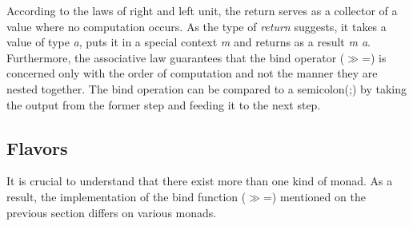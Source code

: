 \documentclass[a4paper, onecolumn]{article}
\begin{document}
According to the laws of right and left unit, the return serves as a collector of a value where no computation occurs. As the type of \textit{return} suggests, it takes a value of type \textit{a}, puts it in a special context \textit{m} and returns as a result \textit{m a}. Furthermore, the associative law guarantees that the bind operator ($\gg$=) is concerned only with the order of computation and not the manner they are nested together. The bind operation can be compared to a semicolon(;) by taking the output from the former step and feeding it to the next step.
\subsection{Flavors}

It is crucial to understand that there exist more than one kind of monad. As a result, the implementation of the bind function ($\gg$=) mentioned on the previous section differs on various monads. 
\end{document}
